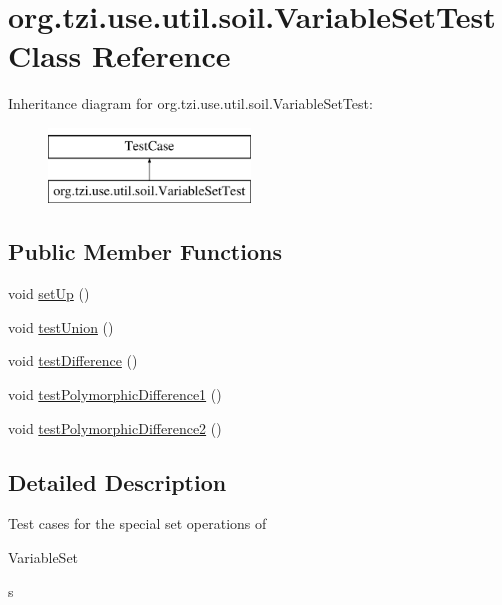 \hypertarget{classorg_1_1tzi_1_1use_1_1util_1_1soil_1_1_variable_set_test}{\section{org.\-tzi.\-use.\-util.\-soil.\-Variable\-Set\-Test Class Reference}
\label{classorg_1_1tzi_1_1use_1_1util_1_1soil_1_1_variable_set_test}
}
Inheritance diagram for org.\-tzi.\-use.\-util.\-soil.\-Variable\-Set\-Test\-:\begin{figure}[H]
\begin{center}
\leavevmode
\includegraphics[height=2.000000cm]{classorg_1_1tzi_1_1use_1_1util_1_1soil_1_1_variable_set_test}
\end{center}
\end{figure}
\subsection*{Public Member Functions}
\begin{DoxyCompactItemize}
\item 
void \hyperlink{classorg_1_1tzi_1_1use_1_1util_1_1soil_1_1_variable_set_test_a2573bb291596c19c78a241e6ee9fd8ee}{set\-Up} ()
\item 
void \hyperlink{classorg_1_1tzi_1_1use_1_1util_1_1soil_1_1_variable_set_test_a7e33700a370225c25ec442610959fdd0}{test\-Union} ()
\item 
void \hyperlink{classorg_1_1tzi_1_1use_1_1util_1_1soil_1_1_variable_set_test_afff4cee751adf8753c9a55b58bc8e5bb}{test\-Difference} ()
\item 
void \hyperlink{classorg_1_1tzi_1_1use_1_1util_1_1soil_1_1_variable_set_test_a0dbf46f9f30045e625ea6bb3c649d9e7}{test\-Polymorphic\-Difference1} ()
\item 
void \hyperlink{classorg_1_1tzi_1_1use_1_1util_1_1soil_1_1_variable_set_test_aec21a084560338a402b39234f8c2791d}{test\-Polymorphic\-Difference2} ()
\end{DoxyCompactItemize}


\subsection{Detailed Description}
Test cases for the special set operations of
\begin{DoxyCode}
VariableSet 
\end{DoxyCode}
 s

